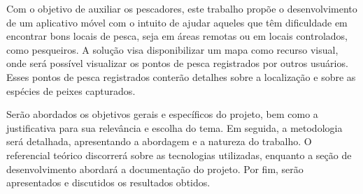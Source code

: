 Com o objetivo de auxiliar os pescadores, este trabalho propõe o desenvolvimento de um aplicativo móvel com o intuito de ajudar aqueles que têm dificuldade em encontrar bons locais de pesca, seja em áreas remotas ou em locais controlados, como pesqueiros. A solução visa disponibilizar um mapa como recurso visual, onde será possível visualizar os pontos de pesca registrados por outros usuários. Esses pontos de pesca registrados conterão detalhes sobre a localização e sobre as espécies de peixes capturados.

Serão abordados os objetivos gerais e específicos do projeto, bem como a justificativa para sua relevância e escolha do tema. Em seguida, a metodologia será detalhada, apresentando a abordagem e a natureza do trabalho. O referencial teórico discorrerá sobre as tecnologias utilizadas, enquanto a seção de desenvolvimento abordará a documentação do projeto. Por fim, serão apresentados e discutidos os resultados obtidos.

